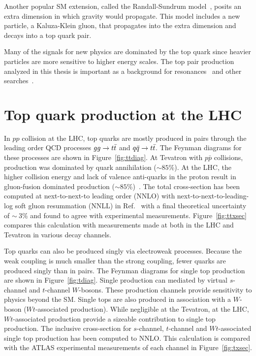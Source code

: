 Another popular SM extension, called the Randall-Sundrum model~\cite{Lillie:2007yh}, posits an extra dimension in which gravity would propagate. This model includes a new particle, a Kaluza-Klein gluon, that propagates into the extra dimension and decays into a top quark pair.

Many of the signals for new physics are dominated by the top quark since heavier particles are more sensitive to higher energy scales.  The top pair production analyzed in this thesis is important as a background for \ttbar resonances~\cite{ATLAS-CONF-2015-009} and other searches~\cite{Aad:2014kra}.



\section{Top quark production at the LHC}

In $pp$ collision at the LHC, top quarks are mostly produced in pairs through the leading order QCD processes  $gg \rightarrow t\bar{t}$ and $q\bar{q} \rightarrow t\bar{t}$. The Feynman diagrams for these processes are shown in Figure~\ref{fig:ttdiag}. At Tevatron with $p\bar{p}$ collisions, \ttbar production was dominated by quark annihilation ($\sim 85$\%). At the LHC, the higher collision energy and lack of valence anti-quarks in the proton result in gluon-fusion dominated \ttbar production ($\sim 85$\%)~\cite{PDG}. The total \ttbar cross-section has been computed at next-to-next-to leading order (NNLO) with next-to-next-to-leading-log soft gluon resummation (NNLL) in Ref.~\cite{Czakon:2013goa} with a final theoretical uncertainty of $\sim\ 3 \%$ and found to agree with experimental measurements. Figure~\ref{fig:ttxsec} compares this calculation with measurements made at both in the LHC and Tevatron in various decay channels.

Top quarks can also be produced singly via electroweak processes. Because the weak coupling is much smaller than the strong coupling, fewer quarks are produced singly than in pairs. The Feynman diagrams for single top production are shown in Figure~\ref{fig:tdiag}. Single production can mediated by virtual $s$-channel and $t$-channel $W$-bosons. These production channels provide sensitivity to physics beyond the SM. Single tops are also produced in association with a $W$-boson ($Wt$-associated production). While negligible at the Tevatron, at the LHC, $Wt$-associated production provide a sizeable contribution to single top production. The inclusive cross-section for $s$-channel, $t$-channel and $Wt$-associated single top production has been computed to NNLO. This calculation is compared with the ATLAS experimental measurements of each channel in Figure~\ref{fig:txsec}.

